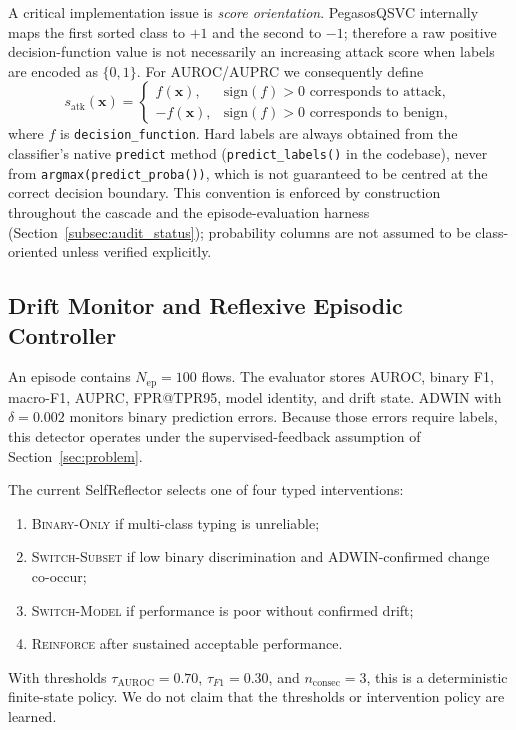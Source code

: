 \documentclass[conference]{IEEEtran}
\begin{document}
A critical implementation issue is \emph{score orientation}. PegasosQSVC
internally maps the first sorted class to $+1$ and the second to $-1$;
therefore a raw positive decision-function value is not necessarily an
increasing attack score when labels are encoded as $\{0,1\}$. For
AUROC/AUPRC we consequently define
\begin{equation}
s_{\text{atk}}(\mathbf{x}) =
\begin{cases}
f(\mathbf{x}), & \text{sign}(f) > 0 \text{ corresponds to attack}, \\
-f(\mathbf{x}), & \text{sign}(f) > 0 \text{ corresponds to benign},
\end{cases}
\label{eq:orientation}
\end{equation}
where $f$ is \texttt{decision\_function}. Hard labels are always obtained
from the classifier's native \texttt{predict} method
(\texttt{predict\_labels()} in the codebase), never from
\texttt{argmax(predict\_proba())}, which is not guaranteed to be centred
at the correct decision boundary. This convention is enforced by
construction throughout the cascade and the episode-evaluation harness
(Section~\ref{subsec:audit_status}); probability columns are not assumed
to be class-oriented unless verified explicitly.

\subsection{Drift Monitor and Reflexive Episodic Controller}
\label{subsec:reflexive}

An episode contains $N_{\text{ep}}=100$ flows. The evaluator stores
AUROC, binary F1, macro-F1, AUPRC, FPR@TPR95, model identity, and drift
state. ADWIN with $\delta=0.002$ monitors binary prediction errors.
Because those errors require labels, this detector operates under the
supervised-feedback assumption of Section~\ref{sec:problem}.

The current SelfReflector selects one of four typed interventions:
\begin{enumerate}
\item \textsc{Binary-Only} if multi-class typing is unreliable;
\item \textsc{Switch-Subset} if low binary discrimination and
ADWIN-confirmed change co-occur;
\item \textsc{Switch-Model} if performance is poor without confirmed
drift;
\item \textsc{Reinforce} after sustained acceptable performance.
\end{enumerate}
With thresholds $\tau_{\text{AUROC}}=0.70$, $\tau_{F1}=0.30$, and
$n_{\text{consec}}=3$, this is a deterministic finite-state policy. We do
not claim that the thresholds or intervention policy are learned.
\end{document}
